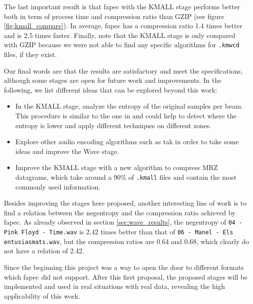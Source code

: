 The last important result is that \acrshort{fapec} with the KMALL stage performs better both in term of process time and compression ratio than GZIP (see figure \ref{fig:kmall_compare}). In average, \acrshort{fapec} has a compression ratio 1.4 times better and is 2.5 times faster. Finally, note that the KMALL stage is only compared with GZIP because we were not able to find any specific algorithms for \texttt{.kmwcd} files, if they exist.

Our final words are that the results are satisfactory and meet the specifications, although some stages are open for future work and improvements. In the following, we list different ideas that can be explored beyond this work:
\begin{itemize}
	\item In the KMALL stage, analyze the entropy of the original samples per beam. This procedure is similar to the one in \parencite{MBESComp} and could help to detect where the entropy is lower and apply different techniques on different zones.
	\item Explore other audio encoding algorithms such as \acrshort{tak} in order to take some ideas and improve the Wave stage.
	\item Improve the KMALL stage with a new algorithm to compress MRZ datagrams, which take around a 90\% of \texttt{.kmall} files and contain the most commonly used information.
\end{itemize}

Besides improving the stages here proposed, another interesting line of work is to find a relation between the negentropy and the compression ratio achieved by \acrshort{fapec}. As already observed in section \ref{sec:wave_results}, the negentropy of \texttt{04 - Pink Floyd - Time.wav} is 2.42 times better than that of \texttt{06 - Manel - Els entusiasmats.wav}, but the compression ratios are 0.64 and 0.68, which clearly do not have a relation of 2.42.

Since the beginning this project was a way to open the door to different formats which \acrshort{fapec} did not support. After this first proposal, the proposed stages will be implemented and used in real situations with real data, revealing the high applicability of this work.
